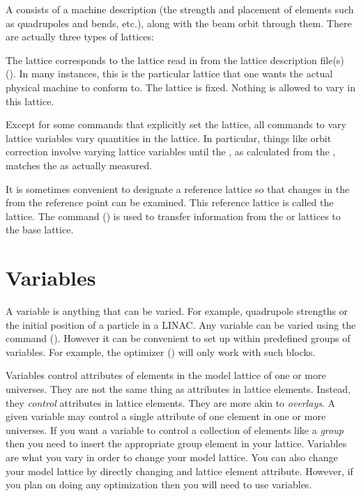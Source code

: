 A  consists of a machine description (the strength and
placement of elements such as quadrupoles and bends, etc.), along with the
beam orbit through them. There are actually three types of lattices:
  \vspace*{-3ex}
  \begin{description}
  \item[Design Lattice] \Newline 
The  lattice corresponds to the lattice read in from the
lattice description file(s) (). In many instances, this
is the particular lattice that one wants the actual physical machine
to conform to. The  lattice is fixed. Nothing is allowed to
vary in this lattice.
  \item[Model Lattice] \Newline
Except for some commands that explicitly set the  lattice,
all \tao commands to vary lattice variables vary quantities in the
 lattice. In particular, things like orbit correction
involve varying  lattice variables until the ,
as calculated from the , matches the  as actually measured.
  \item[Base Lattice] \Newline
It is sometimes convenient to designate a reference lattice so that
changes in the  from the reference point can be examined.
This reference lattice is called the  lattice. The 
command () is used to transfer information from the
 or  lattices to the base lattice.
  \end{description}

\section{Variables}
\label{s:variable.overview}

A variable is anything that can be varied. For example, quadrupole
strengths or the initial position of a particle in a LINAC. Any
variable can be varied using the  command
(). However it can be convenient to set up within \tao
predefined groups of variables. For example, the optimizer
() will only work with such blocks.

Variables control attributes of elements in the model lattice of one
or more universes. They are not the same thing as attributes in
lattice elements.  Instead, they \textit{control} attributes in
lattice elements. They are more akin to \bmad \textit{overlays}. A
given variable may control a single attribute of one element in one or
more universes. If you want a variable to control a collection of
elements like a \bmad \textit{group} then you need to insert the
appropriate group element in your lattice. Variables are what you vary in
order to change your model lattice. You can also change your model
lattice by directly changing and lattice element attribute. However,
if you plan on doing any optimization then you will need to use
variables.

